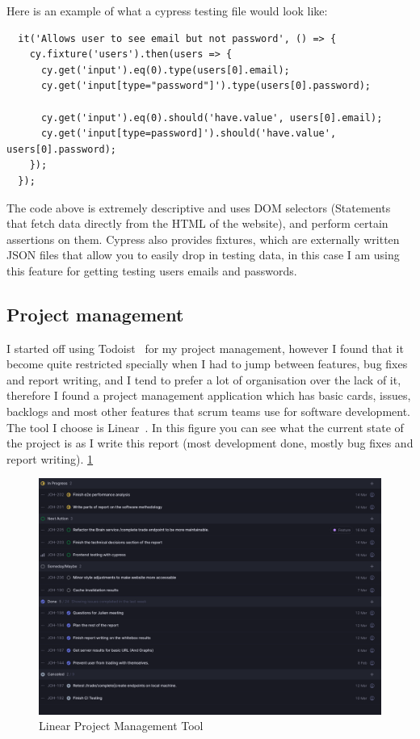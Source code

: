 \documentclass[titlepage]{article}
\begin{document}
Here is an example of what a cypress testing file would look like:

\begin{verbatim}
  it('Allows user to see email but not password', () => {
    cy.fixture('users').then(users => {
      cy.get('input').eq(0).type(users[0].email);
      cy.get('input[type="password"]').type(users[0].password);

      cy.get('input').eq(0).should('have.value', users[0].email);
      cy.get('input[type=password]').should('have.value', users[0].password);
    });
  });
\end{verbatim}

The code above is extremely descriptive and uses DOM selectors (Statements that fetch data directly from the HTML of the website), and perform certain assertions on them. Cypress also provides fixtures, which are externally written JSON files that allow you to easily drop in testing data, in this case I am using this feature for getting testing users emails and passwords.

\subsection{Project management}
I started off using Todoist~\cite{todoist} for my project management, however I found that it become quite restricted specially when I had to jump between features, bug fixes and report writing, and I tend to prefer a lot of organisation over the lack of it, therefore I found a project management application which has basic cards, issues, backlogs and most other features that scrum teams use for software development. The tool I choose is Linear~\cite{linear}. In this figure you can see what the current state of the project is as I write this report (most development done, mostly bug fixes and report writing). \ref{linear_example}

\begin{figure}[h]
\includegraphics[width=\textwidth]{../Diagrams/linear.png}
  \caption{Linear Project Management Tool}
\label{linear_example}
\end{figure}
\end{document}
